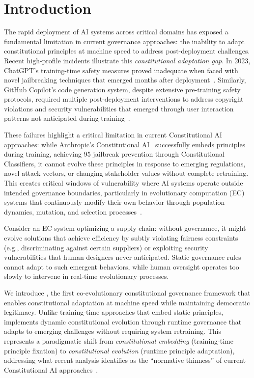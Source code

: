 \section{Introduction}\label{sec:introduction}

The rapid deployment of AI systems across critical domains has exposed a fundamental limitation in current governance approaches: the inability to adapt constitutional principles at machine speed to address post-deployment challenges. Recent high-profile incidents illustrate this \textit{constitutional adaptation gap}. In 2023, ChatGPT's training-time safety measures proved inadequate when faced with novel jailbreaking techniques that emerged months after deployment~\cite{wei2023jailbroken}. Similarly, GitHub Copilot's code generation system, despite extensive pre-training safety protocols, required multiple post-deployment interventions to address copyright violations and security vulnerabilities that emerged through user interaction patterns not anticipated during training~\cite{copilot2023incidents}.

These failures highlight a critical limitation in current Constitutional AI approaches: while Anthropic's Constitutional AI~\cite{anthropic2022constitutional} successfully embeds principles during training, achieving 95\percent{} jailbreak prevention through Constitutional Classifiers, it cannot evolve these principles in response to emerging regulations, novel attack vectors, or changing stakeholder values without complete retraining. This creates critical windows of vulnerability where AI systems operate outside intended governance boundaries, particularly in evolutionary computation (EC) systems that continuously modify their own behavior through population dynamics, mutation, and selection processes~\cite{russell2020artificial}.

Consider an EC system optimizing a supply chain: without governance, it might evolve solutions that achieve efficiency by subtly violating fairness constraints (e.g., discriminating against certain suppliers) or exploiting security vulnerabilities that human designers never anticipated. Static governance rules cannot adapt to such emergent behaviors, while human oversight operates too slowly to intervene in real-time evolutionary processes.

We introduce \acgs{}, the first co-evolutionary constitutional governance framework that enables constitutional adaptation at machine speed while maintaining democratic legitimacy. Unlike training-time approaches that embed static principles, \acgs{} implements dynamic constitutional evolution through runtime governance that adapts to emerging challenges without requiring system retraining. This represents a paradigmatic shift from \textit{constitutional embedding} (training-time principle fixation) to \textit{constitutional evolution} (runtime principle adaptation), addressing what recent analysis identifies as the ``normative thinness'' of current Constitutional AI approaches~\cite{digitalconstitutionalist2023}.

